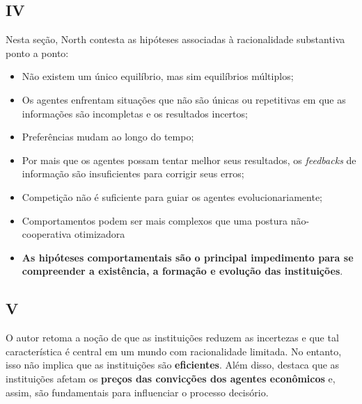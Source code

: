 \subsection{IV}

Nesta seção, North contesta as hipóteses associadas à racionalidade substantiva ponto a ponto:
\begin{itemize}
	\item Não existem um único equilíbrio, mas sim equilíbrios múltiplos;
	\item Os agentes enfrentam situações que não são únicas ou repetitivas em que as informações são incompletas e os resultados incertos;
	\item Preferências mudam ao longo do tempo;
	\item Por mais que os agentes possam tentar melhor seus resultados, os \textit{feedbacks} de informação são insuficientes para corrigir seus erros;
	\item Competição não é suficiente para guiar os agentes evolucionariamente;
	\item Comportamentos podem ser mais complexos que uma postura não-cooperativa otimizadora
	\item \textbf{As hipóteses comportamentais são o principal impedimento para se compreender a existência, a formação e evolução das instituições}.
\end{itemize}

\subsection{V}

O autor retoma a noção de que as instituições reduzem as incertezas e que tal característica é central em um mundo com racionalidade limitada. No entanto, isso não implica que as instituições são \textbf{eficientes}. Além disso, destaca que as instituições afetam os \textbf{preços das convicções dos agentes econômicos} e, assim, são fundamentais para influenciar o processo decisório.